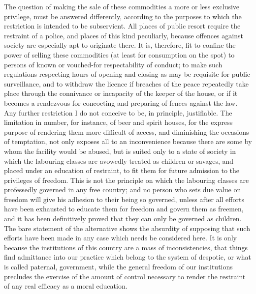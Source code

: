 \documentclass[11pt,openany]{book}
\begin{document}
The question of making the sale of these commodities a more or less exclusive privilege, must be answered differently, according to the purposes to which the restriction is intended to be subservient. All places of public resort require the restraint of a police, and places of this kind peculiarly, because offences against society are especially apt to originate there. It is, therefore, fit to confine the power of selling these commodities (at least for consumption on the spot) to persons of known or vouched-for respectability of conduct; to make such regulations respecting hours of opening and closing as may be requisite for public surveillance, and to withdraw the licence if breaches of the peace repeatedly take place through the connivance or incapacity of the keeper of the house, or if it becomes a rendezvous for concocting and preparing of-fences against the law. Any further restriction I do not conceive to be, in principle, justifiable. The limitation in number, for instance, of beer and spirit houses, for the express purpose of rendering them more difficult of access, and diminishing the occasions of temptation, not only exposes all to an inconvenience because there are some by whom the facility would be abused, but is suited only to a state of society in which the labouring classes are avowedly treated as children or savages, and placed under an education of restraint, to fit them for future admission to the privileges of freedom. This is not the principle on which the labouring classes are professedly governed in any free country; and no person who sets due value on freedom will give his adhesion to their being so governed, unless after all efforts have been exhausted to educate them for freedom and govern them as freemen, and it has been definitively proved that they can only be governed as children. The bare statement of the alternative shows the absurdity of supposing that such efforts have been made in any case which needs be considered here. It is only because the institutions of this country are a mass of inconsistencies, that things find admittance into our practice which belong to the system of despotic, or what is called paternal, government, while the general freedom of our institutions precludes the exercise of the amount of control necessary to render the restraint of any real efficacy as a moral education.
\end{document}
